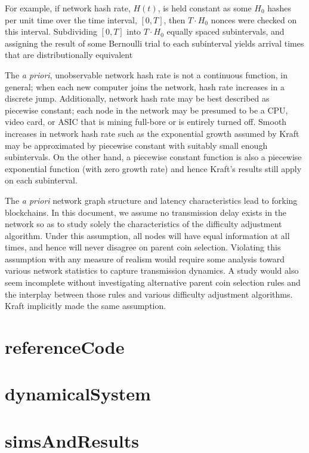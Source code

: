 \documentclass[12pt,english]{mrl}
\theoremstyle{definition}
\numberwithin{equation}{section}
\numberwithin{figure}{section}
\numberwithin{equation}{section}
\numberwithin{equation}{section}
\numberwithin{figure}{section}
\begin{document}
For example, if network hash rate, $H(t)$, is held constant as some $H_0$ hashes per unit time over the time interval, $[0,T]$, then $T\cdot H_0$ nonces were checked on this interval. Subdividing $[0,T]$ into $T\cdot H_0$ equally spaced subintervals, and assigning the result of some Bernoulli trial to each subinterval yields arrival times that are distributionally equivalent


The \textit{a priori}, unobservable network hash rate is not a continuous function, in general; when each new computer joins the network, hash rate increases in a discrete jump. Additionally, network hash rate may be best described as piecewise constant; each node in the network may be presumed to be a CPU, video card, or ASIC that is mining full-bore or is entirely turned off. Smooth increases in network hash rate such as the exponential growth assumed by Kraft may be approximated by piecewise constant with suitably small enough subintervals. On the other hand, a piecewise constant function is also a piecewise exponential function (with zero growth rate) and hence Kraft's results still apply on each subinterval. 

The \textit{a priori} network graph structure and latency characteristics lead to forking blockchains. In this document, we assume no transmission delay exists in the network so as to study solely the characteristics of the difficulty adjustment algorithm. Under this assumption, all nodes will have equal information at all times, and hence will never disagree on parent coin selection. Violating this assumption with any measure of realism would require some analysis toward various network statistics to capture transmission dynamics. A study would also seem incomplete without investigating alternative parent coin selection rules and the interplay between those rules and various difficulty adjustment algorithms. Kraft implicitly made the same assumption.



\section{referenceCode}

\section{dynamicalSystem}

\section{simsAndResults}
\end{document}
